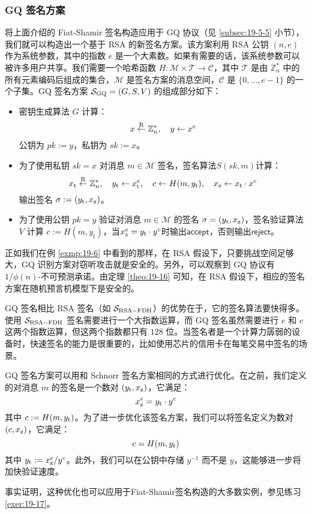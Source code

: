 \subsubsection{GQ 签名方案}

将上面介绍的 Fiat-Shamir 签名构造应用于 GQ 协议（见 \ref{subsec:19-5-5} 小节），我们就可以构造出一个基于 RSA 的新签名方案。该方案利用 RSA 公钥 $(n,e)$ 作为系统参数，其中的指数 $e$ 是一个大素数。如果有需要的话，该系统参数可以被许多用户共享。我们需要一个哈希函数 $H:\mathcal{M}\times\mathcal{T}\to\mathcal{C}$，其中 $\mathcal{T}$ 是由 $\mathbb{Z}_n^*$ 中的所有元素编码后组成的集合，$\mathcal{M}$ 是签名方案的消息空间，$\mathcal{C}$ 是 $\{0,\dots,e-1\}$ 的一个子集。GQ 签名方案 $\mathcal{S}_{\rm GQ}=(G,S,V)$ 的组成部分如下：
\begin{itemize}
	\item 密钥生成算法 $G$ 计算：
	\[
    x\overset{\rm R}\leftarrow\mathbb{Z}_n^*,
    \quad
    y\leftarrow x^e
    \]
	公钥为 $pk:=y$，私钥为 $sk:=x$。
	\item 为了使用私钥 $sk=x$ 对消息 $m\in\mathcal{M}$ 签名，签名算法$S(sk,m)$计算：
    \[
    x_{\rm t}\overset{\rm R}\leftarrow \mathbb{Z}_n^*,
    \quad
    y_{\rm t}\leftarrow x_{\rm t}^e,
    \quad
    c\leftarrow H(m,y_{\rm t}),
    \quad
    x_{\rm z}\leftarrow x_{\rm t}\cdot x^c
    \]
    输出签名 $\sigma:=(y_{\rm t},x_{\rm z})$。
	\item 为了使用公钥 $pk=y$ 验证对消息 $m\in\mathcal{M}$ 的签名  $\sigma=(y_{\rm t},x_{\rm z})$，签名验证算法 $V$ 计算 $c:=H(m,y_t)$，当$x_{\rm z}^e=y_{\rm t}\cdot y^c$时输出$\mathsf{accept}$，否则输出$\mathsf{reject}$。
\end{itemize}    

正如我们在例 \ref{exmp:19-6} 中看到的那样，在 RSA 假设下，只要挑战空间足够大，GQ 识别方案对窃听攻击就是安全的。另外，可以观察到 GQ 协议有 ${1}/{\phi(n)}$-不可预测承诺。由定理 \ref{theo:19-16} 可知，在 RSA 假设下，相应的签名方案在随机预言机模型下是安全的。

GQ 签名相比 RSA 签名（如 $\mathcal{S}_{\rm RSA-FDH}$）的优势在于，它的签名算法要快得多。使用 $\mathcal{S}_{\rm RSA-FDH}$ 签名需要进行一个大指数运算，而 GQ 签名虽然需要进行 $e$ 和 $c$ 这两个指数运算，但这两个指数都只有 $128$ 位。当签名者是一个计算力孱弱的设备时，快速签名的能力是很重要的，比如使用芯片的信用卡在每笔交易中签名的场景。

\begin{snote}[一个优化.]
GQ 签名方案可以用和 Schnorr 签名方案相同的方式进行优化。在之前，我们定义的对消息 $m$ 的签名是一个数对  $(y_{\rm t},x_{\rm z})$，它满足：
\[
x_{\rm z}^e=y_{\rm t}\cdot y^c
\]
其中 $c:=H(m,y_{\rm t})$。为了进一步优化该签名方案，我们可以将签名定义为数对 $(c,x_{\rm z})$，它满足：
\[
c=H(m,y_{\rm t})
\]
其中 $y_{\rm t}:={x_{\rm z}^e}/{y^c}$。此外，我们可以在公钥中存储 $y^{-1}$ 而不是 $y$，这能够进一步将加快验证速度。

事实证明，这种优化也可以应用于Fiat-Shamir签名构造的大多数实例，参见练习 \ref{exer:19-17}。
\end{snote}
